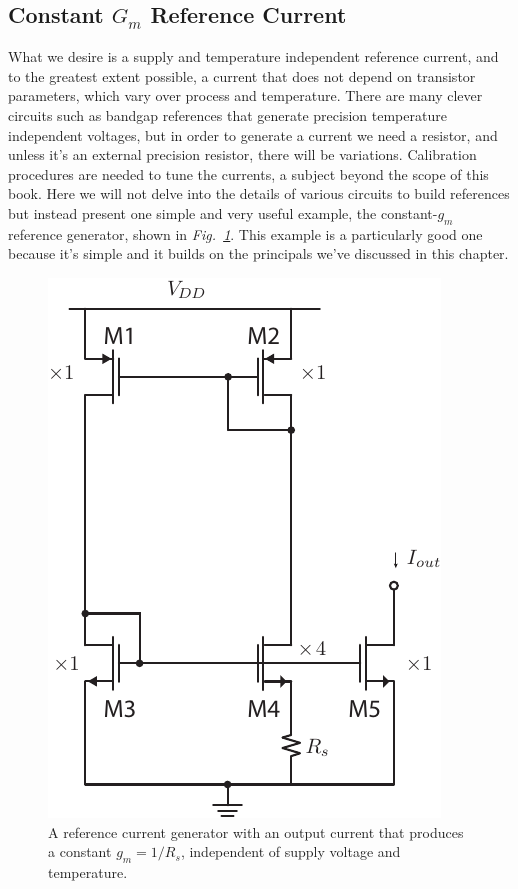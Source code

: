\subsection{Constant \texorpdfstring{$G_m$}{Transconductance} Reference Current}
What we desire is a supply and temperature independent reference current, and to the greatest extent possible, a current that does not depend on transistor parameters, which vary over process and temperature.  There are many clever circuits such as bandgap references that generate precision temperature independent voltages, but in order to generate a current we need a resistor, and unless it's an external precision resistor, there will be variations.  Calibration procedures are needed to tune the currents, a subject beyond the scope of this book.
Here we will not delve into the details of various circuits to build references but instead present one simple and very useful example, the constant-$g_m$ reference generator, shown in \emph{Fig.~\ref{fig:constant_gm_ref}}.  This example is a particularly good one because it's simple and it builds on the principals we've discussed in this chapter.
\begin{figure}[tb]
\centering
\includegraphics[scale=1]{constant_gm_bias.pdf}
\caption{A reference current generator with an output current that produces a constant $g_m = 1/R_s$, independent of supply voltage and temperature.}
\label{fig:constant_gm_ref}
\end{figure}
